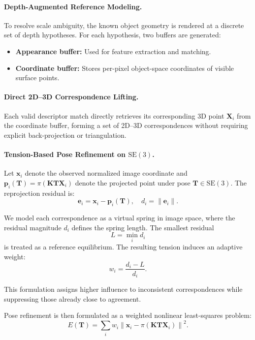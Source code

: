 \paragraph{Depth-Augmented Reference Modeling.}
To resolve scale ambiguity, the known object geometry is rendered at a discrete set of depth hypotheses. For each hypothesis, two buffers are generated:
\begin{itemize}
    \item \textbf{Appearance buffer:} Used for feature extraction and matching.
    \item \textbf{Coordinate buffer:} Stores per-pixel object-space coordinates of visible surface points.
\end{itemize}

\paragraph{Direct 2D--3D Correspondence Lifting.}
Each valid descriptor match directly retrieves its corresponding 3D point $\mathbf{X}_i$ from the coordinate buffer, forming a set of 2D--3D correspondences without requiring explicit back-projection or triangulation.

\paragraph{Tension-Based Pose Refinement on $\mathrm{SE}(3)$.}

Let $\mathbf{x}_i$ denote the observed normalized image coordinate and $\mathbf{p}_i(\mathbf{T}) = \pi(\mathbf{K}\mathbf{T}\mathbf{X}_i)$ denote the projected point under pose $\mathbf{T} \in \mathrm{SE}(3)$. The reprojection residual is:
\begin{equation}
\mathbf{e}_i = \mathbf{x}_i - \mathbf{p}_i(\mathbf{T}), \quad d_i = \|\mathbf{e}_i\|.
\end{equation}

We model each correspondence as a virtual spring in image space, where the residual magnitude $d_i$ defines the spring length. The smallest residual
\[
L = \min_i d_i
\]
is treated as a reference equilibrium. The resulting tension induces an adaptive weight:
\begin{equation}
w_i = \frac{d_i - L}{d_i}.
\end{equation}

This formulation assigns higher influence to inconsistent correspondences while suppressing those already close to agreement.

Pose refinement is then formulated as a weighted nonlinear least-squares problem:
\begin{equation}
E(\mathbf{T}) =
\sum_i w_i \left\| \mathbf{x}_i - \pi(\mathbf{K}\mathbf{T}\mathbf{X}_i) \right\|^2.
\end{equation}

